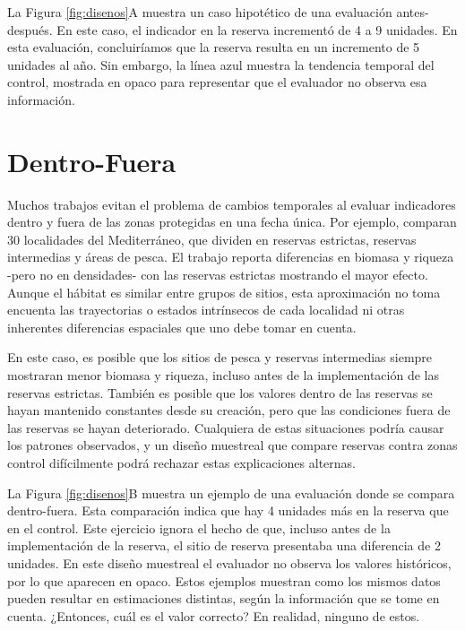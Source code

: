 \documentclass[]{krantz}
\begin{document}
La Figura \ref{fig:disenos}A muestra un caso hipotético de una
evaluación antes-después. En este caso, el indicador en la reserva
incrementó de 4 a 9 unidades. En esta evaluación, concluiríamos que la
reserva resulta en un incremento de 5 unidades al año. Sin embargo, la
línea azul muestra la tendencia temporal del control, mostrada en opaco
para representar que el evaluador no observa esa información.

\hypertarget{dentro-fuera}{%
\section{Dentro-Fuera}\label{dentro-fuera}}

Muchos trabajos evitan el problema de cambios temporales al evaluar
indicadores dentro y fuera de las zonas protegidas en una fecha única.
Por ejemplo, \citet{guidetti_2014} comparan 30 localidades del
Mediterráneo, que dividen en reservas estrictas, reservas intermedias y
áreas de pesca. El trabajo reporta diferencias en biomasa y riqueza
-pero no en densidades- con las reservas estrictas mostrando el mayor
efecto. Aunque el hábitat es similar entre grupos de sitios, esta
aproximación no toma encuenta las trayectorias o estados intrínsecos de
cada localidad ni otras inherentes diferencias espaciales que uno debe
tomar en cuenta.

En este caso, es posible que los sitios de pesca y reservas intermedias
siempre mostraran menor biomasa y riqueza, incluso antes de la
implementación de las reservas estrictas. También es posible que los
valores dentro de las reservas se hayan mantenido constantes desde su
creación, pero que las condiciones fuera de las reservas se hayan
deteriorado. Cualquiera de estas situaciones podría causar los patrones
observados, y un diseño muestreal que compare reservas contra zonas
control difícilmente podrá rechazar estas explicaciones alternas.

La Figura \ref{fig:disenos}B muestra un ejemplo de una evaluación donde
se compara dentro-fuera. Esta comparación indica que hay 4 unidades más
en la reserva que en el control. Este ejercicio ignora el hecho de que,
incluso antes de la implementación de la reserva, el sitio de reserva
presentaba una diferencia de 2 unidades. En este diseño muestreal el
evaluador no observa los valores históricos, por lo que aparecen en
opaco. Estos ejemplos muestran como los mismos datos pueden resultar en
estimaciones distintas, según la información que se tome en cuenta.
¿Entonces, cuál es el valor correcto? En realidad, ninguno de estos.
\end{document}

